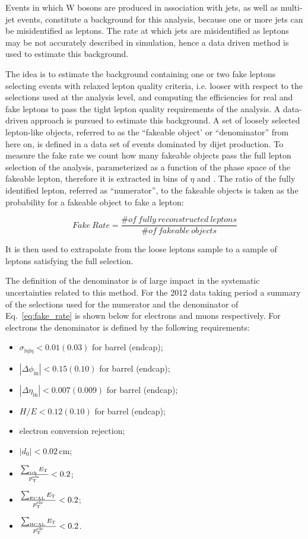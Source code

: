 Events in which W bosons are produced in association with jets, as well as multi-jet events, constitute a background for this analysis, because one or more jets can be misidentified as leptons. The rate at which jets are misidentified as leptons may be not accurately described in simulation, hence a data driven method is used to estimate this background. 
	
The idea is to estimate the background containing one or two fake leptons selecting events with relaxed lepton quality criteria, i.e. looser with respect to the selections used at the analysis level, and computing the efficiencies for real and fake leptons to pass the tight lepton quality requirements of the analysis. 
A data-driven approach is pursued to estimate this background. A set of loosely selected lepton-like objects, referred to as the ``fakeable object' or ``denominator'' from here on, is defined in a data set of events dominated by dijet production.
To measure the fake rate we count how many fakeable objects pass the full lepton selection 
of the analysis, parameterized as a function of the phase space of the fakeable lepton, therefore 
it is extracted in bins of $\eta$ and \pt.
The ratio of the fully identified lepton, referred as ``numerator'', to the 
fakeable objects is taken as the probability for a fakeable object to fake a lepton:

\begin{equation} \label{eq:fake_rate}
{Fake\ Rate } = \frac{\# of \ fully \ reconstructed \ leptons}{\# of \ fakeable \ objects} 
\end{equation}

It is then used to extrapolate from the loose leptons sample to a sample of leptons satisfying the  
full selection.

The definition of the denominator is of large impact in the systematic uncertainties related to this method. For the 2012 data taking period a summary of the selections used for the numerator and the denominator of Eq.~\eqref{eq:fake_rate} is shown below for electrons and muons respectively.
For electrons the denominator is defined by the following requirements:

\begin{itemize}
\item $\sigma_\mathrm{i\eta i\eta} < 0.01 (0.03)$ for barrel (endcap);
\item $|\Delta\phi_\mathrm{in}| < 0.15 (0.10)$ for barrel (endcap);
\item $|\Delta\eta_\mathrm{in}| < 0.007 (0.009)$ for barrel (endcap);
\item $H/E < 0.12 (0.10)$ for barrel (endcap);
\item electron conversion rejection;
\item $|d_0| < 0.02$\,cm;
\item $\frac{\sum_\mathrm{trk}E_\mathrm{T}}{p_\mathrm{T}^\mathrm{ele}} < 0.2$;
\item $\frac{\sum_\mathrm{ECAL}E_\mathrm{T}}{p_\mathrm{T}^\mathrm{ele}} < 0.2$;
\item $\frac{\sum_\mathrm{HCAL}E_\mathrm{T}}{p_\mathrm{T}^\mathrm{ele}} < 0.2$.
\end{itemize}

